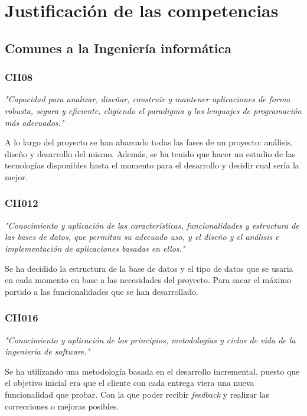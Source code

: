 \section{Justificación de las competencias}

\subsection{Comunes a la Ingeniería informática}

\subsubsection{CII08}
\textit{"Capacidad para analizar, diseñar, construir y mantener aplicaciones de forma
robusta, segura y eficiente, eligiendo el paradigma y los lenguajes de programación más
adecuados."}

\medskip
A lo largo del proyecto se han abarcado todas las fases de un proyecto: análisis, diseño
y desarrollo del mismo. Además, se ha tenido que hacer un estudio de las tecnologías
disponibles hasta el momento para el desarrollo y decidir cual sería la mejor.

\subsubsection{CII012}
\textit{"Conocimiento y aplicación de las características, funcionalidades y estructura de las
bases de datos, que permitan su adecuado uso, y el diseño y el análisis
e implementación de aplicaciones basadas en ellos."}

\medskip
Se ha decidido la estructura de la base de datos y el tipo de datos que se usaria en cada
momento en base a las necesidades del proyecto. Para sacar el máximo partido a las
funcionalidades que se han desarrollado.

\subsubsection{CII016}
\textit{"Conocimiento y aplicación de los principios, metodologías y ciclos de vida de la
ingeniería de software."}

\medskip
Se ha utilizando una metodología basada en el desarrollo incremental, puesto que el objetivo
inicial era que el cliente con cada entrega viera una nueva funcionalidad que probar. Con la
que poder recibir \textit{feedback} y realizar las correcciones o mejoras posibles.


